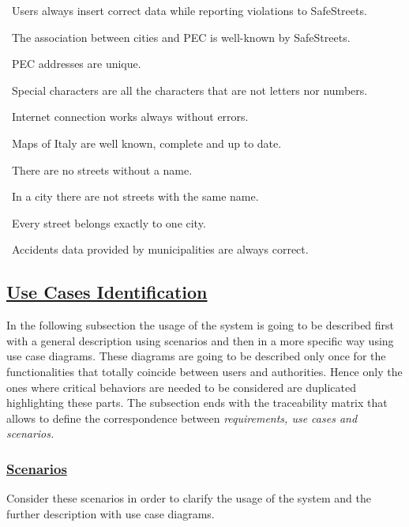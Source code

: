 \begin{description}
\begin{description}
					\item {}\ Users always insert correct data while reporting violations to SafeStreets.
					\item {}\ The association between cities and PEC is well-known by SafeStreets.
					\item {}\ PEC addresses are unique.
					\item {}\ Special characters are all the characters that are not letters nor numbers.
					\item {}\ Internet connection works always without errors.
					\item {}\ Maps of Italy are well known, complete and up to date.
					\item {}\ There are no streets without a name.
					\item {}\ In a city there are not streets with the same name.
					\item {}\ Every street belongs exactly to one city.
					\item {}\ Accidents data provided by municipalities are always correct.	
				\end{description}		
		\end{description}
	
		\newpage

\subsection[Use Cases Identification]{\hyperlink{toc}{Use Cases Identification}}
	In the following subsection the usage of the system is going to be described first with a general description using scenarios and then in a more specific way using use case diagrams. These diagrams are going to be described only once for the functionalities that totally coincide between users and authorities. Hence only the ones where critical behaviors are needed to be considered are duplicated highlighting these parts. The subsection ends with the traceability matrix that allows to define the correspondence between \emph{requirements, use cases and scenarios.}
	
	\subsubsection[Scenarios]{\hyperlink{toc}{Scenarios}}
		Consider these scenarios in order to clarify the usage of the system and the further description with use case diagrams.
		
